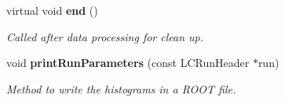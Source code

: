 \begin{DoxyCompactItemize}
\item 
virtual void {\bf end} ()\label{classmarlin_1_1RunInfoProcessor_a8c82fcf3504ddc1d1cd83bd3df48b8a1}

\begin{DoxyCompactList}\small\item\em Called after data processing for clean up. \item\end{DoxyCompactList}\item 
void {\bf printRunParameters} (const LCRunHeader $\ast$run)\label{classmarlin_1_1RunInfoProcessor_ae0df13a558cff819a125d7da430d3ca8}

\begin{DoxyCompactList}\small\item\em Method to write the histograms in a ROOT file. \item\end{DoxyCompactList}\end{DoxyCompactItemize}
